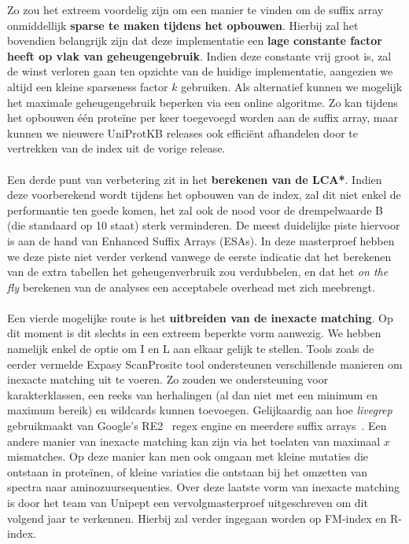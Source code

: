 Zo zou het extreem voordelig zijn om een manier te vinden om de suffix array onmiddellijk \textbf{sparse te maken tijdens het opbouwen}.
Hierbij zal het bovendien belangrijk zijn dat deze implementatie een \textbf{lage constante factor heeft op vlak van geheugengebruik}.
Indien deze constante vrij groot is, zal de winst verloren gaan ten opzichte van de huidige implementatie, aangezien we altijd een kleine sparseness factor $k$ gebruiken.
Als alternatief kunnen we mogelijk het maximale geheugengebruik beperken via een online algoritme.
Zo kan tijdens het opbouwen één proteïne per keer toegevoegd worden aan de suffix array, maar kunnen we nieuwere UniProtKB releases ook efficiënt afhandelen door te vertrekken van de index uit de vorige release.
\\ \\
Een derde punt van verbetering zit in het \textbf{berekenen van de LCA*}.
Indien deze voorberekend wordt tijdens het opbouwen van de index, zal dit niet enkel de performantie ten goede komen, het zal ook de nood voor de drempelwaarde B (die standaard op 10 staat) sterk verminderen.
De meest duidelijke piste hiervoor is aan de hand van Enhanced Suffix Arrays (ESAs).
In deze masterproef hebben we deze piste niet verder verkend vanwege de eerste indicatie dat het berekenen van de extra tabellen het geheugenverbruik zou verdubbelen, en dat het \textit{on the fly} berekenen van de analyses een acceptabele overhead met zich meebrengt.
\\ \\
Een vierde mogelijke route is het \textbf{uitbreiden van de inexacte matching}.
Op dit moment is dit slechts in een extreem beperkte vorm aanwezig.
We hebben namelijk enkel de optie om I en L aan elkaar gelijk te stellen.
Tools zoals de eerder vermelde Expasy ScanProsite tool ondersteunen verschillende manieren om inexacte matching uit te voeren.
Zo zouden we ondersteuning voor karakterklassen, een reeks van herhalingen (al dan niet met een minimum en maximum bereik) en wildcards kunnen toevoegen.
Gelijkaardig aan hoe \textit{livegrep}~\cite{livegrep} gebruikmaakt van Google's RE2~\cite{re2} regex engine en meerdere suffix arrays~\cite{regex_sa}.
Een andere manier van inexacte matching kan zijn via het toelaten van maximaal $x$ mismatches.
Op deze manier kan men ook omgaan met kleine mutaties die ontstaan in proteïnen, of kleine variaties die ontstaan bij het omzetten van spectra naar aminozuursequenties.
Over deze laatste vorm van inexacte matching is door het team van Unipept een vervolgmasterproef uitgeschreven om dit volgend jaar te verkennen.
Hierbij zal verder ingegaan worden op FM-index en R-index.